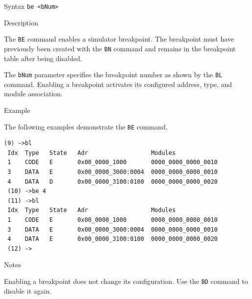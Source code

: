 %
%
\pagebreak
{}

\begin{iPageDescEntry}{Syntax}
\texttt{be  <bNum>  }
\end{iPageDescEntry}

\begin{iPageDescEntry}{Description}

The \texttt{BE} command enables a simulator breakpoint. The breakpoint
must have previously been created with the \texttt{BN} command and
remains in the breakpoint table after being disabled.

The \texttt{bNum} parameter specifies the breakpoint number as shown by
the \texttt{BL} command. Enabling a breakpoint activates its configured
address, type, and module association.

\end{iPageDescEntry}

\begin{iPageDescEntry}{Example}

The following examples demonstrate the \texttt{BE} command. 

\begin{lstlisting}[style=iPageOpStyle]
 (9) ->bl
 Idx  Type   State   Adr                  Modules         
 1    CODE   E       0x00_0000_1000       0000_0000_0000_0010
 3    DATA   E       0x00_0000_3000:0004  0000_0000_0000_0010
 4    DATA   D       0x00_0000_3100:0100  0000_0000_0000_0020
 (10) ->be 4
 (11) ->bl
 Idx  Type   State   Adr                  Modules         
 1    CODE   E       0x00_0000_1000       0000_0000_0000_0010
 3    DATA   E       0x00_0000_3000:0004  0000_0000_0000_0010
 4    DATA   E       0x00_0000_3100:0100  0000_0000_0000_0020
 (12) ->
\end{lstlisting}

\end{iPageDescEntry}

\begin{iPageDescEntry}{Notes}

Enabling a breakpoint does not change its configuration. Use the
\texttt{BD} command to disable it again.

\end{iPageDescEntry}
